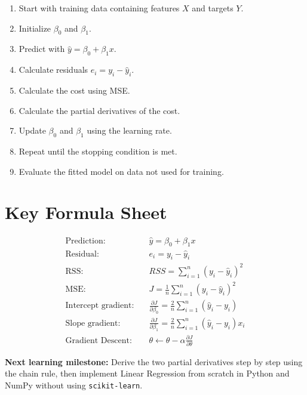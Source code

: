 \documentclass[11pt,a4paper]{article}
\begin{document}
\begin{enumerate}
\item Start with training data containing features $X$ and targets $Y$.
\item Initialize $\beta_0$ and $\beta_1$.
\item Predict with $\hat y=\beta_0+\beta_1x$.
\item Calculate residuals $e_i=y_i-\hat y_i$.
\item Calculate the cost using MSE.
\item Calculate the partial derivatives of the cost.
\item Update $\beta_0$ and $\beta_1$ using the learning rate.
\item Repeat until the stopping condition is met.
\item Evaluate the fitted model on data not used for training.
\end{enumerate}

\section{Key Formula Sheet}

\begin{align*}
\text{Prediction:}\quad & \hat y=\beta_0+\beta_1x\\[4pt]
\text{Residual:}\quad & e_i=y_i-\hat y_i\\[4pt]
\text{RSS:}\quad & RSS=\sum_{i=1}^{n}(y_i-\hat y_i)^2\\[4pt]
\text{MSE:}\quad & J=\frac{1}{n}\sum_{i=1}^{n}(y_i-\hat y_i)^2\\[4pt]
\text{Intercept gradient:}\quad &
\frac{\partial J}{\partial\beta_0}
=\frac{2}{n}\sum_{i=1}^{n}(\hat y_i-y_i)\\[4pt]
\text{Slope gradient:}\quad &
\frac{\partial J}{\partial\beta_1}
=\frac{2}{n}\sum_{i=1}^{n}(\hat y_i-y_i)x_i\\[4pt]
\text{Gradient Descent:}\quad &
\theta\leftarrow\theta-\alpha\frac{\partial J}{\partial\theta}
\end{align*}

\textbf{Next learning milestone:} Derive the two partial derivatives step by step using the chain rule, then implement Linear Regression from scratch in Python and NumPy without using \texttt{scikit-learn}.
\end{document}
